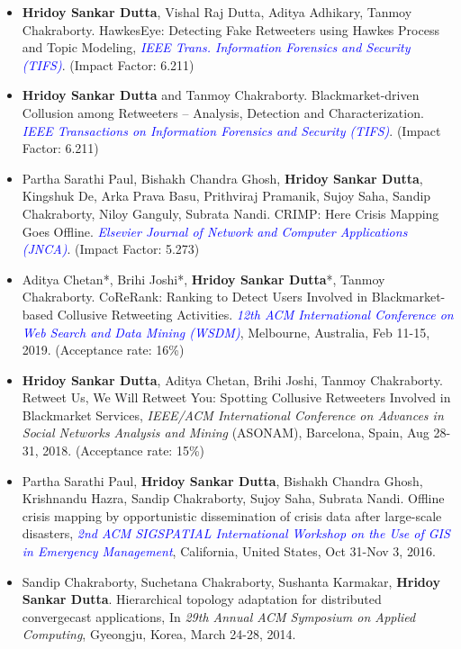 \documentclass[margin, centered]{res}
\begin{document}
\begin{resume}
\begin{itemize}[leftmargin=*]
\item \textbf{Hridoy Sankar Dutta}, Vishal Raj Dutta, Aditya Adhikary, Tanmoy Chakraborty. HawkesEye: Detecting Fake Retweeters using Hawkes Process and Topic Modeling,  \textit{\textcolor{blue}{IEEE Trans. Information Forensics and Security (TIFS)}}. (Impact Factor: 6.211)

\item \textbf{Hridoy Sankar Dutta} and Tanmoy Chakraborty. Blackmarket-driven Collusion among Retweeters – Analysis, Detection and Characterization. \textit{\textcolor{blue}{IEEE Transactions on Information Forensics and Security (TIFS)}}. (Impact Factor: 6.211)

\item Partha Sarathi Paul, Bishakh Chandra Ghosh, \textbf{Hridoy Sankar Dutta}, Kingshuk De, Arka Prava Basu, Prithviraj Pramanik, Sujoy Saha, Sandip Chakraborty, Niloy Ganguly, Subrata Nandi. CRIMP: Here Crisis Mapping Goes Offline. \textit{\textcolor{blue}{Elsevier Journal of Network and Computer Applications (JNCA)}}. (Impact Factor: 5.273)

\item  Aditya Chetan*, Brihi Joshi*, \textbf{Hridoy Sankar Dutta}*, Tanmoy Chakraborty. CoReRank: Ranking to Detect Users Involved in Blackmarket-based Collusive Retweeting Activities. \textit{\textcolor{blue}{12th ACM International Conference on Web Search and Data Mining (WSDM)}}, Melbourne, Australia, Feb 11-15, 2019. (Acceptance rate: 16\%)


\item \textbf{Hridoy Sankar Dutta}, Aditya Chetan, Brihi Joshi, Tanmoy Chakraborty. Retweet Us, We Will Retweet You: Spotting Collusive Retweeters Involved in Blackmarket Services, \textit{IEEE/ACM International Conference on Advances in Social Networks Analysis and Mining} (ASONAM), Barcelona, Spain, Aug 28-31, 2018. (Acceptance rate: 15\%)

\item Partha Sarathi Paul, \textbf{Hridoy Sankar Dutta}, Bishakh Chandra Ghosh, Krishnandu Hazra, Sandip Chakraborty, Sujoy Saha, Subrata Nandi. Offline crisis mapping by opportunistic dissemination of crisis data after large-scale disasters, \textit{\textcolor{blue}{2nd ACM SIGSPATIAL International Workshop on the Use of GIS in Emergency Management}}, California, United States, Oct 31-Nov 3, 2016.

\item Sandip Chakraborty, Suchetana Chakraborty, Sushanta Karmakar, \textbf{Hridoy Sankar Dutta}. Hierarchical topology adaptation for distributed convergecast applications, In \textit{29th Annual ACM Symposium on Applied Computing}, Gyeongju, Korea, March 24-28, 2014.
\end{itemize}


\end{resume}
\end{document}
